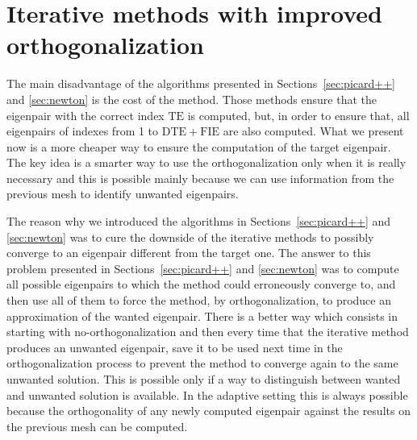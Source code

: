 \documentclass[preprint,12pt]{elsarticle}
\begin{document}
\begin{algorithm}[H]
\begin{algorithmic}



\ENDFOR
{}

\end{algorithmic}
\end{algorithm}

\section{Iterative methods with improved orthogonalization}\label{sec:imp_ortho}

The main disadvantage of the algorithms presented in Sections~\ref{sec:picard++} and \ref{sec:newton} is the cost of the method. Those methods ensure that the eigenpair with the correct index $\mathrm{TE}$ is computed, but, in order to ensure that, all eigenpairs of indexes from 1 to $\mathrm{DTE}+\mathrm{FIE}$ are also computed. What we present now is a more cheaper way to ensure the computation of the target eigenpair. The key idea is a smarter way to use the orthogonalization only when it is really necessary and this is possible mainly because we can use information from the previous mesh to identify unwanted eigenpairs.

The reason why we introduced the algorithms in Sections~\ref{sec:picard++} and \ref{sec:newton} was to cure the downside of the iterative methods to possibly converge to an eigenpair different from the target one. The answer to this problem presented in Sections~\ref{sec:picard++} and \ref{sec:newton} was to compute all possible eigenpairs to which the method could erroneously converge to, and then use all of them to force the method, by orthogonalization, to produce an approximation of the wanted eigenpair. There is a better way which consists in starting with no-orthogonalization and then every time that the iterative method produces an unwanted eigenpair, save it to be used next time in the orthogonalization process to prevent the method to converge again to the same unwanted solution. This is possible only if a way to distinguish between wanted and unwanted solution is available. In the adaptive setting this is always possible because  the orthogonality of any newly computed eigenpair against the results on the previous mesh can be computed.
\end{document}
